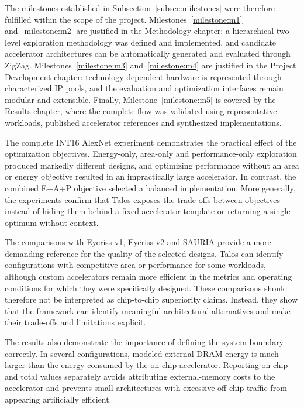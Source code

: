 The milestones established in Subsection~\ref{subsec:milestones} were
therefore fulfilled within the scope of the project.
Milestones~\ref{milestone:m1} and~\ref{milestone:m2} are justified in
the Methodology chapter: a hierarchical two-level exploration
methodology was defined and implemented, and candidate accelerator
architectures can be automatically generated and evaluated through
ZigZag. Milestones~\ref{milestone:m3} and~\ref{milestone:m4} are
justified in the Project Development chapter: technology-dependent
hardware is represented through characterized IP pools, and the
evaluation and optimization interfaces remain modular and extensible.
Finally, Milestone~\ref{milestone:m5} is covered by the Results
chapter, where the complete flow was validated using representative
workloads, published accelerator references and synthesized
implementations.

The complete INT16 AlexNet experiment demonstrates the practical
effect of the optimization objectives. Energy-only, area-only and
performance-only exploration produced markedly different designs, and
optimizing performance without an area or energy objective resulted in
an impractically large accelerator. In contrast, the combined E+A+P
objective selected a balanced implementation. More generally, the
experiments confirm that Talos exposes the trade-offs between
objectives instead of hiding them behind a fixed accelerator template
or returning a single optimum without context.

The comparisons with Eyeriss v1, Eyeriss v2 and SAURIA provide a more
demanding reference for the quality of the selected designs. Talos can
identify configurations with competitive area or performance for some
workloads, although custom accelerators remain more efficient in the
metrics and operating conditions for which they were specifically
designed. These comparisons should therefore not be interpreted as
chip-to-chip superiority claims. Instead, they show that the framework
can identify meaningful architectural alternatives and make their
trade-offs and limitations explicit.

The results also demonstrate the importance of defining the system
boundary correctly. In several configurations, modeled external DRAM
energy is much larger than the energy consumed by the on-chip
accelerator. Reporting on-chip and total values separately avoids
attributing external-memory costs to the accelerator and prevents
small architectures with excessive off-chip traffic from appearing
artificially efficient.

